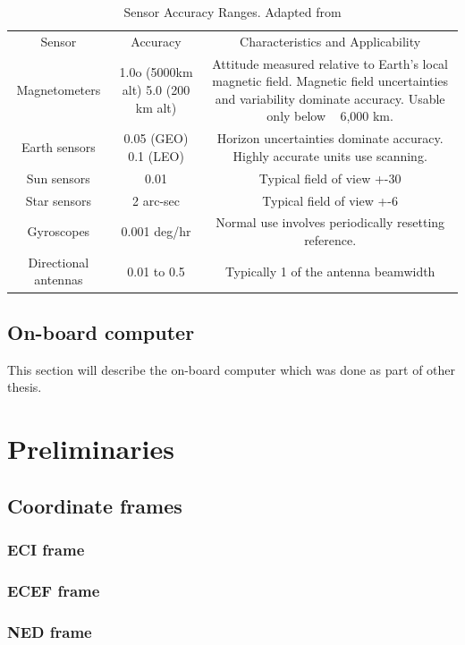 \documentclass[12pt,a4paper,oneside]{article}
\begin{document}
\cite{larson1992space}
\begin{table}[ht]

\begin{tabular}{ccc}
Sensor & Accuracy & Characteristics and Applicability \\ 
Magnetometers & 1.0o (5000km alt) 5.0 (200 km alt) & Attitude measured relative to Earth’s local magnetic field. Magnetic field uncertainties and variability dominate accuracy. Usable only below ~ 6,000 km. \\ 
Earth sensors & 0.05 (GEO) 0.1 (LEO) & Horizon uncertainties dominate accuracy. Highly accurate units use scanning. \\ 
Sun sensors & 0.01 & Typical field of view +-30 \\ 
Star sensors & 2 arc-sec & Typical field of view +-6 \\ 
Gyroscopes & 0.001 deg/hr & Normal use involves periodically resetting reference. \\ 
Directional antennas & 0.01 to 0.5 & Typically 1 of the antenna beamwidth

\end{tabular} 
\caption{Sensor Accuracy Ranges. Adapted from \cite{hall2003spacecraft}}

\end{table}
\cite{lima2000comparison}

\subsection{On-board computer}
This section will describe the on-board computer which was done as part of other thesis.

\newpage
\section{Preliminaries}
\subsection{Coordinate frames}
\subsubsection{ECI frame}
\cite{larson1992space}
\subsubsection{ECEF frame}
\subsubsection{NED frame}
\end{document}
